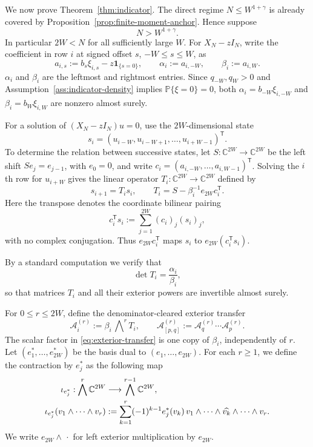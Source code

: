 \documentclass[11pt,reqno]{amsart}
\numberwithin{equation}{section}
\theoremstyle{definition}
\theoremstyle{remark}
\newcommand{\C}{\mathbb C}
\newcommand{\Pp}{\mathbb P}
\newcommand{\1}{\mathbf 1}
\begin{document}
We now prove Theorem~\ref{thm:indicator}.  The direct regime
$N\le W^{1+\gamma}$ is already covered by
Proposition~\ref{prop:finite-moment-anchor}.  Hence suppose
\begin{equation}\label{eq:long-regime}
 N>W^{1+\gamma}.
\end{equation}
In particular $2W<N$ for all sufficiently large $W$.  For $X_N-zI_N$,
write the coefficient in row $i$ at signed offset $s$, $-W\le s\le W$, as
\begin{equation}\label{eq:row-coefficients}
 a_{i,s}:=b_s\xi_{i,s}-z\1_{\{s=0\}},\qquad
 \alpha_i:=a_{i,-W},\qquad \beta_i:=a_{i,W}.
\end{equation}
$\alpha_i$ and $\beta_i$ are the leftmost and rightmost entries. Since $q_{-W},q_W>0$ and Assumption~\ref{ass:indicator-density} implies
$\Pp\{\xi=0\}=0$, both
$\alpha_i=b_{-W}\xi_{i,-W}$ and
$\beta_i=b_W\xi_{i,W}$ are nonzero almost surely.

For a solution of $(X_N-zI_N)u=0$, use the $2W$-dimensional state
\[
 s_i=(u_{i-W},u_{i-W+1},\ldots,u_{i+W-1})^{\mathsf T}.
\]
To determine the relation between successive states, let
$S:\mathbb C^{2W}\to\mathbb C^{2W}$ be the left shift
$Se_j=e_{j-1}$, with $e_0=0$, and write
\(c_i=(a_{i,-W},\ldots,a_{i,W-1})^{\mathsf T}\).  Solving the $i$th row
for $u_{i+W}$ gives the linear operator
$T_i:\mathbb C^{2W}\to\mathbb C^{2W}$ defined by
\begin{equation}\label{eq:companion-transfer}
 s_{i+1}=T_i s_i,\qquad
 T_i=S-\beta_i^{-1}e_{2W}c_i^{\mathsf T}.
\end{equation}
Here the transpose denotes the coordinate bilinear pairing
\[
 c_i^{\mathsf T}s_i:=\sum_{j=1}^{2W}(c_i)_j(s_i)_j,
\]
with no complex conjugation.  Thus
$e_{2W}c_i^{\mathsf T}$ maps $s_i$ to
$e_{2W}(c_i^{\mathsf T}s_i)$.


By a standard computation we verify that
\begin{equation}\label{eq:companion-determinant}
 \det T_i=\frac{\alpha_i}{\beta_i},
\end{equation}
so that matrices $T_i$ and all their exterior powers are invertible almost
surely.

For $0\le r\le2W$, define the denominator-cleared exterior transfer
\begin{equation}\label{eq:exterior-transfer}
 \mathcal A_i^{(r)}:=\beta_i\,\bigwedge\nolimits^rT_i,\qquad
 \mathcal A_{[p,q]}^{(r)}
 :=\mathcal A_q^{(r)}\cdots\mathcal A_p^{(r)}.
\end{equation}
The scalar factor in \eqref{eq:exterior-transfer} is one copy of
$\beta_i$, independently of $r$.  Let
$(e_1^*,\ldots,e_{2W}^*)$ be the basis dual to
$(e_1,\ldots,e_{2W})$.  For each $r\ge1$, we define the contraction by $e_j^*$ as the following map
\begin{align}
 \iota_{e_j^*}:\bigwedge^r\C^{2W}&\longrightarrow
 \bigwedge^{r-1}\C^{2W},                                      \label{eq:contraction-definition}\\
 \iota_{e_j^*}(v_1\wedge\cdots\wedge v_r)
 &:=\sum_{k=1}^r(-1)^{k-1}e_j^*(v_k)\,
 v_1\wedge\cdots\wedge\widehat{v_k}\wedge\cdots\wedge v_r.
 \notag
\end{align}
We write $e_{2W}\wedge\,\cdot$ for left exterior multiplication by
$e_{2W}$.
\end{document}
